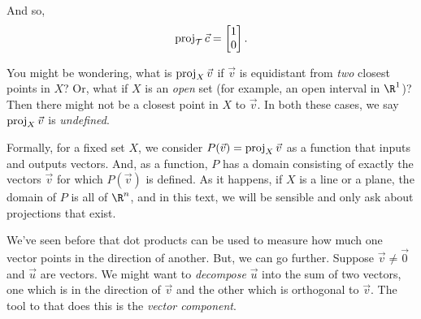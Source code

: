 \begin{example}
\begin{center}
\end{center}

	And so, 
	\[
		\Proj_{\mathcal T}\vec c =\mat{1\\0}.
	\]
\end{example}

You might be wondering, what is $\operatorname{proj}_X\vec v$ if $\vec v$ is equidistant from \emph{two}
closest points in $X$? Or, what if $X$ is an \emph{open} set (for example, an open interval in $\R^1$)?
Then there might not be a closest point in $X$ to $\vec v$. In both these cases, we say $\operatorname{proj}_X\vec v$
is \emph{undefined}.

Formally, for a fixed set $X$, we consider $P(\vec v)=\operatorname{proj}_X\vec v$ as a function that inputs and outputs
vectors. And, as a function, $P$ has a domain consisting of exactly the vectors $\vec v$ for which $P(\vec v)$
is defined. As it happens, if $X$ is a line or a plane, the domain of $P$ is all of $\R^n$, and in this text,
we will be sensible and only ask about projections that exist. 


We've seen before that dot products can be used to measure how much one
vector points in the direction of another. But, we can go further. Suppose 
$\vec v\neq \vec 0$ and $\vec u$ are vectors. We might want to \emph{decompose}
$\vec u$ into the sum of two vectors, one which is in the direction of $\vec v$
and the other which is orthogonal to $\vec v$. The tool to that does this is the \emph{vector component}.

